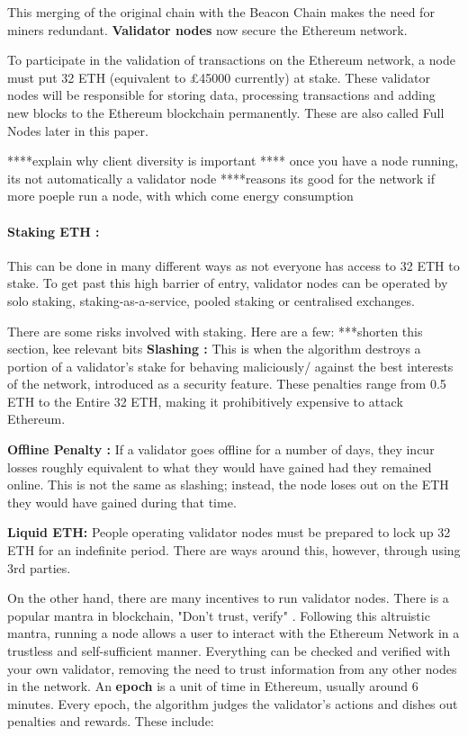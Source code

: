 This merging of the original chain with the Beacon Chain makes the need for miners redundant. \textbf{Validator nodes} now secure the Ethereum network. 

To participate in the validation of transactions on the Ethereum network, a node must put 32 ETH (equivalent to £45000 currently) at stake. These validator nodes will be responsible for storing data, processing transactions and adding new blocks to the Ethereum blockchain permanently. These are also called Full Nodes later in this paper.


 ****explain why client diversity is important
 **** once you have a node running, its not automatically a validator node
****reasons its good for the network if more poeple run a node, with which come energy consumption
 
\paragraph{Staking ETH :}
This can be done in many different ways as not everyone has access to 32 ETH to stake. To get past this high barrier of entry, validator nodes can be operated by solo staking, staking-as-a-service, pooled staking or centralised exchanges.

There are some risks involved with staking. Here are a few:
 ***shorten this section, kee relevant bits
\textbf{Slashing :}
This is when the algorithm destroys a portion of a validator's stake for behaving maliciously/ against the best interests of the network, introduced as a security feature. These penalties range from 0.5 ETH to the Entire 32 ETH, making it prohibitively expensive to attack Ethereum. 

\textbf{Offline Penalty :}
If a validator goes offline for a number of days, they incur losses roughly equivalent to what they would have gained had they remained online. This is not the same as slashing; instead, the node loses out on the ETH they would have gained during that time.

\textbf{Liquid ETH: }
People operating validator nodes must be prepared to lock up 32 ETH for an indefinite period. There are ways around this, however, through using 3rd parties. 
 
On the other hand, there are many incentives to run validator nodes. There is a popular mantra in blockchain, "Don't trust, verify" \cite{EthereumEthereum.org}. Following this altruistic mantra, running a node allows a user to interact with the Ethereum Network in a trustless and self-sufficient manner. Everything can be checked and verified with your own validator, removing the need to trust information from any other nodes in the network. An \textbf{epoch} is a unit of time in Ethereum, usually around 6 minutes. Every epoch, the algorithm judges the validator's actions and dishes out penalties and rewards. These include:

